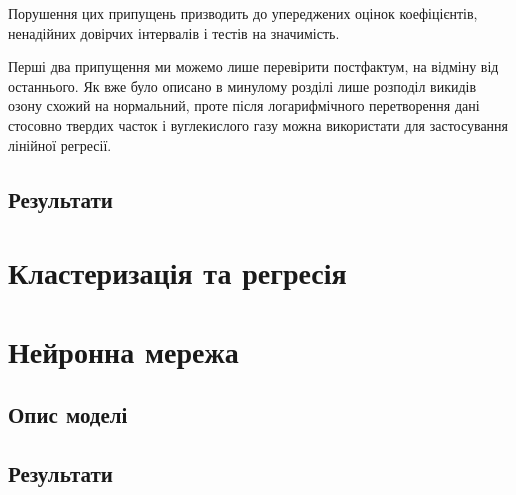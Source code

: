 Порушення цих припущень призводить до упереджених оцінок коефіцієнтів, ненадійних довірчих інтервалів і тестів на значимість.

Перші два припущення ми можемо лише перевірити постфактум, на відміну від останнього. 
Як вже було описано в минулому розділі лише розподіл викидів озону схожий на нормальний, проте після логарифмічного перетворення дані стосовно твердих часток і вуглекислого газу можна використати для застосування лінійної регресії.

\subsection{Результати}

\section{Кластеризація та регресія}


\section{Нейронна мережа}

\subsection{Опис моделі}

\subsection{Результати}
